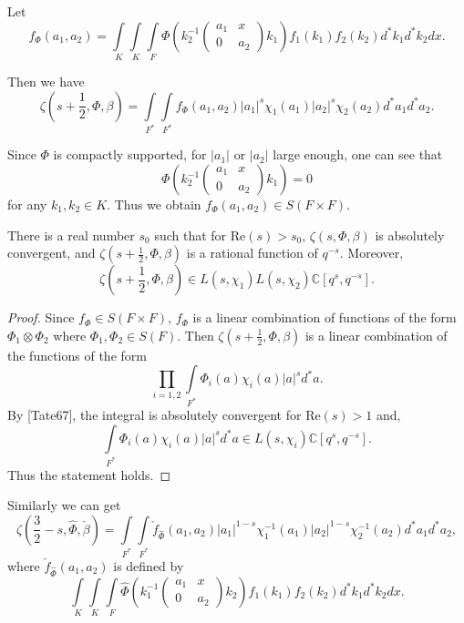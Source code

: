 Let
\[
f_\Phi(a_1,a_2) =\int \limits _ K\int\limits _K \int\limits _F\Phi\left ( k_2^{-1}\left( \begin{array}{cc}
a_1 & x\\
0 & a_2
\end{array}
\right ) k_1 \right )f_1(k_1)f_2(k_2)d^*k_1d^*k_2dx.
\]

Then we have
\begin{equation}\label{1.3.1}
\zeta (s+\frac 1 2,\Phi,\beta)=\int\limits _{F^*}\int\limits_{F^*} f_\Phi(a_1,a_2) |a_1|^s\chi_1(a_1)|a_2|^s\chi_2(a_2) d^*a_1d^*a_2.
\end{equation}

Since $\Phi$ is compactly supported, for $\left | a_1 \right |$ or $\left | a_2 \right |$ large enough, one can see that
\[
\Phi\left (k_2^{-1} \left (
    \begin{array}{cc}
	a_1 & x \\
	0 & a_2
\end{array} \right ) k_1 \right ) =0
\]
for any $k_1,k_2\in K$. Thus
we obtain
$f_\Phi(a_1,a_2) \in S( F\times F)$.

\begin{theorem}
There is a real number $s_0$ such that for $\mathrm {Re}(s)> s_0$, $\zeta (s,\Phi, \beta)$ is absolutely convergent, and $\zeta (s+\frac 1 2,\Phi,\beta)$ is a rational function of $q^{-s}$. Moreover,
\[
\zeta(s+\frac 1 2,\Phi,\beta)\in L(s,\chi_1)L(s,\chi_2)\mathbb C[q^s,q^{-s}].
\]
\end{theorem}

\begin{proof}
Since $f_\Phi\in S(F\times F)$, $f_\Phi$ is a linear combination of functions of the form $\Phi_1\otimes \Phi_2$ where $\Phi_1,\Phi_2\in S(F)$. Then $\zeta(s+\frac 1 2,\Phi,\beta)$ is a linear combination of the functions of the form
\[
\prod\limits_{i=1,2} \int\limits_{F^*} \Phi_i(a)\chi_i(a) \left | a \right |^s d^* a.
\]
By [Tate67], the integral is absolutely convergent for $\mathrm {Re} (s)>1$ and,
\[
\int\limits_{F^*} \Phi_i(a)\chi_i(a) \left | a \right |^s d^* a\in L(s,\chi_i) \mathbb C[q^s,q^{-s}].
\]
Thus the statement holds.
\end{proof}

Similarly we can get
\begin{equation}\label{1.3.2}
\zeta (\frac 3 2-s,\widehat \Phi,\check \beta)=\int\limits _{F^*}\int\limits_{F^*}\check f_{\hat \Phi}(a_1,a_2) |a_1|^{1-s}\chi_1^{-1}(a_1)|a_2|^{1-s}\chi_2^{-1}(a_2) d^*a_1d^*a_2,
\end{equation}
where $\check f_{\widehat \Phi}(a_1,a_2)$ is defined by
\[\int \limits _ K\int\limits _K \int\limits _F \widehat \Phi\left ( k_1^{-1}\left( \begin{array}{cc}
a_1 & x\\
0 & a_2
\end{array}
\right ) k_2 \right )f_1(k_1)f_2(k_2)d^*k_1d^*k_2dx.\]

